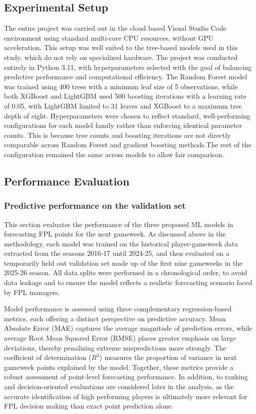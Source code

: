 \documentclass[11pt,a4paper]{article}
\begin{document}
\subsection{Experimental Setup}
The entire project was carried out in the cloud based Visual Studio Code environment using standard multi-core CPU resources, without GPU acceleration. This setup was well suited to the tree-based models used in this study, which do not rely on specialized hardware. The project was conducted entirely in Python 3.11, with hyperparameters selected with the goal of balancing predictive performance and computational efficiency. The Random Forest model was trained using 400 trees with a minimum leaf size of 5 observations, while both XGBoost and LightGBM used 500 boosting iterations with a learning rate of 0.05, with LightGBM limited to 31 leaves and XGBoost to a maximum tree depth of eight. Hyperparameters were chosen to reflect standard, well-performing configurations for each model family rather than enforcing identical parameter counts. This is because tree counts and boosting iterations are not directly comparable across Random Forest and gradient boosting methods.The rest of the configuration remained the same across models to allow fair comparison.   

\subsection{Performance Evaluation}
\subsubsection{Predictive performance on the validation set}
This section evaluates the performance of the three proposed ML models in forecasting FPL points for the next gameweek. As discussed above in the methodology, each model was trained on the historical player-gameweek data extracted from the seasons 2016-17 until 2024-25, and then evaluated on a temporarily held out validation set made up of the first nine gameweeks in the 2025-26 season. All data splits were performed in a chronological order, to avoid data leakage and to ensure the model reflects a realistic forecasting scenario faced by FPL managers. 

Model performance is assessed using three complementary regression-based metrics, each offering a distinct perspective on predictive accuracy. Mean Absolute Error (MAE) captures the average magnitude of prediction errors, while average Root Mean Squared Error (RMSE) places greater emphasis on large deviations, thereby penalizing extreme mispredictions more strongly. The coefficient of determination ($R^2$) measures the proportion of variance in next gameweek points explained by the model. Together, these metrics provide a robust assessment of point-level forecasting performance. In addition, to ranking and decision-oriented evaluations are considered later in the analysis, as the accurate identification of high performing players is ultimately more relevant for FPL decision making than exact point prediction alone.
\end{document}
